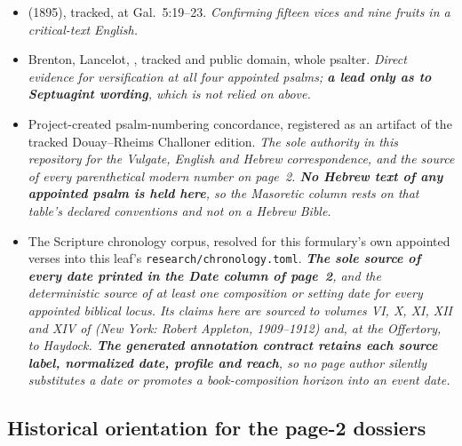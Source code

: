 \begin{itemize}[leftmargin=1.2em, itemsep=0.15em]
{work registered here is Hoffmann's  in CSEL~40.2, read
above. Two further registered witnesses reach appointed loci without having been
used for the readings printed: ~80 for Theodoret's psalm
commentary and ~37 for Augustine's 
on Pss.~80--150.}
\item {} (1895), tracked, at Gal.\ 5:19--23.
\textit{Confirming fifteen vices and nine fruits in a critical-text English.}
\item Brenton, Lancelot, ,
tracked and public domain, whole psalter. \textit{Direct evidence for
versification at all four appointed psalms; \textbf{a lead only as to Septuagint
wording}, which is not relied on above.}
\item Project-created psalm-numbering concordance, registered as an artifact of
the tracked Douay--Rheims Challoner edition. \textit{The sole authority in this
repository for the Vulgate, English and Hebrew correspondence, and the source
of every parenthetical modern number on page~2. \textbf{No Hebrew text of any
appointed psalm is held here}, so the Masoretic column rests on that table's
declared conventions and not on a Hebrew Bible.}
\item The Scripture chronology corpus, resolved for this formulary's own
appointed verses into this leaf's \texttt{research/chronology.toml}.
\textit{\textbf{The sole source of every date printed in the Date column of
page~2}, and the deterministic source of at least one composition or setting
date for every appointed biblical locus. Its claims here are sourced to
volumes VI, X, XI, XII and XIV of  (New York:
Robert Appleton, 1909--1912) and, at the Offertory, to Haydock. \textbf{The
generated annotation contract retains each source label, normalized date,
profile and reach}, so no page author silently substitutes a date or promotes
a book-composition horizon into an event date.}
\end{itemize}

\subsection*{Historical orientation for the page-2 dossiers}

